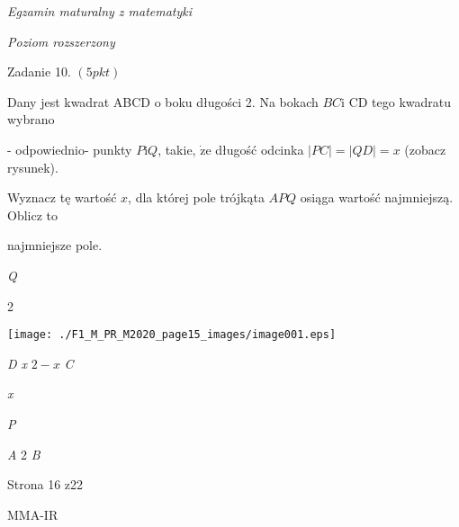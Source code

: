 \documentclass[a4paper,12pt]{article}
\begin{document}
{\it Egzamin maturalny z matematyki}

{\it Poziom rozszerzony}

Zadanie 10. $(5pkt)$

Dany jest kwadrat ABCD o boku długości 2. Na bokach $BC\mathrm{i}$ CD tego kwadratu wybrano

- odpowiednio- punkty $P\mathrm{i}Q$, takie, $\dot{\mathrm{z}}\mathrm{e}$ długość odcinka $|PC|=|QD|=x$ (zobacz rysunek).

Wyznacz tę wartość $x$, dla której pole trójkąta $APQ$ osiąga wartość najmniejszą. Oblicz to

najmniejsze pole.

{\it Q}

2
\begin{center}
\texttt{[image: ./F1\_M\_PR\_M2020\_page15\_images/image001.eps]}
\end{center}
{\it D  x}  $2-x$  {\it C}

{\it x}

{\it P}

{\it A} 2  {\it B}

Strona 16 z22

MMA-IR
\end{document}
